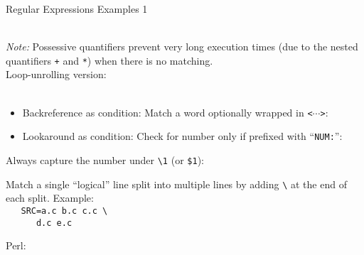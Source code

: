 \documentclass[11pt, a4paper, landscape]{scrartcl}
\newcommand{\regex}[1]{\texttt{#1}}
\newcommand{\cregex}[1]{\colorbox{gray!30}{\regex{#1}}}
\newcommand{\code}[1]{\texttt{#1}}
\newcommand{\bs}{\textbackslash}
\newcommand{\reshortexample}[1]{\cregex{}}
\newcommand{\relongexample}[1]{\regex{}}
\begin{document}
\begin{cheatsheet}{Regular Expressions Examples 1}

\begin{col1}


\reshortexample{./quoted_string.tex}\\
\emph{Note:} Possessive quantifiers prevent very long execution times (due to
the nested quantifiers \cregex{+} and \cregex{*}) when there is no matching.\\
Loop-unrolling version:\\
\reshortexample{./quoted_string_lu.tex}\\


\begin{itemize}
	\item Backreference as condition: Match a word optionally wrapped in \code{<$\cdots$>}:\\
	\reshortexample{./cond_backref.tex}
	\item Lookaround as condition: Check for number only if prefixed with ``\code{NUM:}'':\\
	\reshortexample{./cond_lookaround.tex}
\end{itemize}


Always capture the number under \cregex{\bs{}1} (or \cregex{\$1}):\\
\reshortexample{./branch_reset.tex}


Match a single ``logical'' line split into multiple lines by adding \cregex{\bs}
at the end of each split. Example:\\
\texttt{%
\mbox{}\ \ SRC=a.c b.c c.c \bs\\
\mbox{}\ \ \ \ \ \ d.c e.c}

\relongexample{./cont_line.tex}

\end{col1}

\begin{col2}


Perl:\\
\relongexample{./extract_filename.tex}\\



\end{col2}
\end{cheatsheet}
\end{document}
